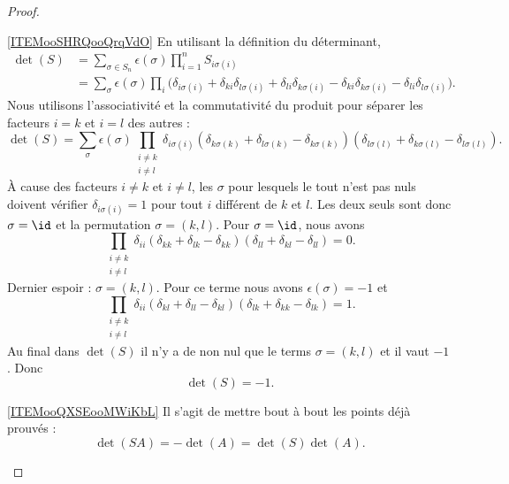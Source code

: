 \begin{proof}
\begin{subproof}
\item[\ref{ITEMooSHRQooQrqVdO}]
            En utilisant la définition du déterminant,
            \begin{subequations}
                \begin{align}
                    \det(S)&=\sum_{\sigma\in S_n}\epsilon(\sigma)\prod_{i=1}^nS_{i\sigma(i)}\\
                    &=\sum_{\sigma}\epsilon(\sigma)\prod_i\big( \delta_{i\sigma(i)}+\delta_{ki}\delta_{l\sigma(i)}+\delta_{li}\delta_{k\sigma(i)}-\delta_{ki}\delta_{k\sigma(i)}-\delta_{li}\delta_{l\sigma(i)} \big).
                \end{align}
            \end{subequations}
            Nous utilisons l'associativité et la commutativité du produit pour séparer les facteurs \( i=k\) et \( i=l\) des autres :
            \begin{equation}
                \det(S)=\sum_{\sigma}\epsilon(\sigma)\prod_{\substack{i\neq k\\i\neq l}}\delta_{i\sigma(i)}(\delta_{k\sigma(k)}+\delta_{l\sigma(k)}-\delta_{k\sigma(k)})(\delta_{l\sigma(l)}+\delta_{k\sigma(l)}-\delta_{l\sigma(l)}).
            \end{equation}
            À cause des facteurs \( i\neq k\) et \( i\neq l\), les \( \sigma\) pour lesquels le tout n'est pas nuls doivent vérifier \( \delta_{i\sigma(i)}=1\) pour tout \( i\) différent de \( k\) et \( l\). Les deux seuls sont donc \( \sigma=\id\) et la permutation \( \sigma=(k,l)\). Pour \( \sigma=\id\), nous avons
            \begin{equation}
                \prod_{\substack{i\neq k\\i\neq l}}\delta_{ii}(\delta_{kk}+\delta_{lk}-\delta_{kk})(\delta_{ll}+\delta_{kl}-\delta_{ll})=0.
            \end{equation}
            Dernier espoir : \( \sigma=(k,l)\). Pour ce terme nous avons \( \epsilon(\sigma)=-1\) et
            \begin{equation}
                \prod_{\substack{i\neq k\\i\neq l}}\delta_{ii}(\delta_{kl}+\delta_{ll}-\delta_{kl})(\delta_{lk}+\delta_{kk}-\delta_{lk})=1.
            \end{equation}
            Au final dans \( \det(S)\) il n'y a de non nul que le terms \( \sigma=(k,l)\) et il vaut \( -1\). Donc
            \begin{equation}
                \det(S)=-1.
            \end{equation}
        \item[\ref{ITEMooQXSEooMWiKbL}]
            Il s'agit de mettre bout à bout les points déjà prouvés :
            \begin{equation}
                \det(SA)=-\det(A)=\det(S)\det(A).
            \end{equation}
    \end{subproof}
\end{proof}

